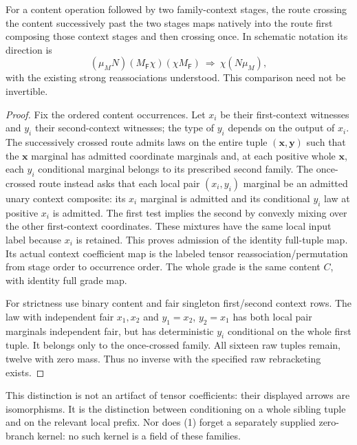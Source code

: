 \documentclass[11pt]{article}
\begin{document}
\begin{proposition}
For a content operation followed by two family-context stages, the route crossing the content successively past the two stages maps natively into the route first composing those context stages and then crossing once. In schematic notation its direction is
\[
 (\mu_M N)(M_{\mathsf F}\chi)(\chi M_{\mathsf F})
 \ \Longrightarrow\ \chi(N\mu_M),                         \tag{1}
\]
with the existing strong reassociations understood. This comparison need not be invertible.
\end{proposition}
\begin{proof}
Fix the ordered content occurrences. Let $x_i$ be their first-context witnesses and $y_i$ their second-context witnesses; the type of $y_i$ depends on the output of $x_i$. The successively crossed route admits laws on the entire tuple $(\mathbf x,\mathbf y)$ such that the $\mathbf x$ marginal has admitted coordinate marginals and, at each positive whole $\mathbf x$, each $y_i$ conditional marginal belongs to its prescribed second family. The once-crossed route instead asks that each local pair $(x_i,y_i)$ marginal be an admitted unary context composite: its $x_i$ marginal is admitted and its conditional $y_i$ law at positive $x_i$ is admitted. The first test implies the second by convexly mixing over the other first-context coordinates. These mixtures have the same local input label because $x_i$ is retained. This proves admission of the identity full-tuple map. Its actual context coefficient map is the labeled tensor reassociation/permutation from stage order to occurrence order. The whole grade is the same content $C$, with identity full grade map.

For strictness use binary content and fair singleton first/second context rows. The law with independent fair $x_1,x_2$ and $y_1=x_2$, $y_2=x_1$ has both local pair marginals independent fair, but has deterministic $y_i$ conditional on the whole first tuple. It belongs only to the once-crossed family. All sixteen raw tuples remain, twelve with zero mass. Thus no inverse with the specified raw rebracketing exists.\end{proof}

This distinction is not an artifact of tensor coefficients: their displayed arrows are isomorphisms. It is the distinction between conditioning on a whole sibling tuple and on the relevant local prefix. Nor does (1) forget a separately supplied zero-branch kernel: no such kernel is a field of these families.
\end{document}
